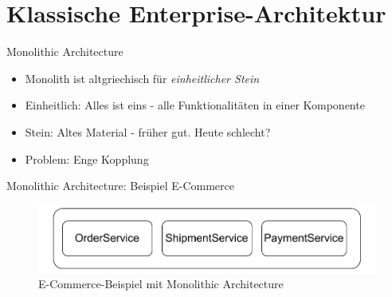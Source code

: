 \section{Klassische Enterprise-Architektur}


\begin{frame}{Monolithic Architecture}
    \begin{itemize}
        \item Monolith ist altgriechisch für \textit{einheitlicher Stein}
        \item Einheitlich: Alles ist eins - alle Funktionalitäten in einer Komponente
        \item Stein: Altes Material - früher gut. Heute schlecht?
        \item Problem: Enge Kopplung
    \end{itemize}
\end{frame}

\begin{frame}{Monolithic Architecture: Beispiel E-Commerce}
    \begin{figure}[!h]
        \centering
        \includegraphics[scale=0.70]{imglib/mono/mono}
        \caption{E-Commerce-Beispiel mit Monolithic Architecture}
        \label{fig:mono-ecommerce}
    \end{figure}
\end{frame}

